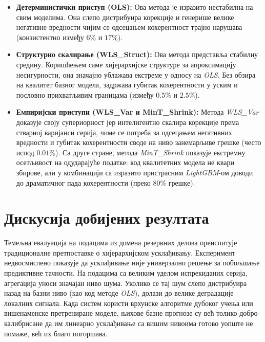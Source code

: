 \documentclass[12pt,oneside]{memoir}
\begin{document}
\begin{itemize}
    \item \textbf{Детерминистички приступ (OLS):} Ова метода је изразито нестабилна на свим моделима. Она слепо дистрибуира корекције и генерише велике негативне вредности чијим се одсецањем кохерентност трајно нарушава (конзистентно између $6\%$ и $17\%$).

    \item \textbf{Структурно скалирање (WLS\_Struct):} Ова метода представља стабилну средину. Коришћењем саме хијерархијске структуре за апроксимацију несигурности, она значајно ублажава екстреме у односу на \textit{OLS}. Без обзира на квалитет базног модела, задржава губитак кохерентности у уским и пословно прихватљивим границама (између $0.5\%$ и $2.5\%$).
    
    \item \textbf{Емпиријски приступи (WLS\_Var и MinT\_Shrink):} Метода \textit{WLS\_Var} доказује своју супериорност јер интелигентно скалира корекције према стварној варијанси серија, чиме се потреба за одсецањем негативних вредности и губитак кохерентности своде на ниво занемарљиве грешке (често испод $0.01\%$). Са друге стране, метода \textit{MinT\_Shrink} показује екстремну осетљивост на одударајуће податке: код квалитетних модела не квари збирове, али у комбинацији са изразито пристрасним \textit{LightGBM}-ом доводи до драматичног пада кохерентности (преко $80\%$ грешке).
\end{itemize}

\section{Дискусија добијених резултата}

Темељна евалуација на подацима из домена резервних делова преиспитује традиционалне претпоставке о хијерархијском усклађивању. Експеримент недвосмислено показује да усклађивање није универзално решење за побољшање предиктивне тачности. На подацима са великим уделом испрекиданих серија, агрегација уноси значајан ниво шума. Уколико се тај шум слепо дистрибуира назад на базни ниво (као код методе \textit{OLS}), долази до велике деградације локалних сигнала. Када систем користи врхунске алгоритме дубоког учења или вишенаменске претрениране моделе, њихове базне прогнозе су већ толико добро калибрисане да им линеарно усклађивање са вишим нивоима готово уопште не помаже, већ их благо погоршава.
\end{document}
